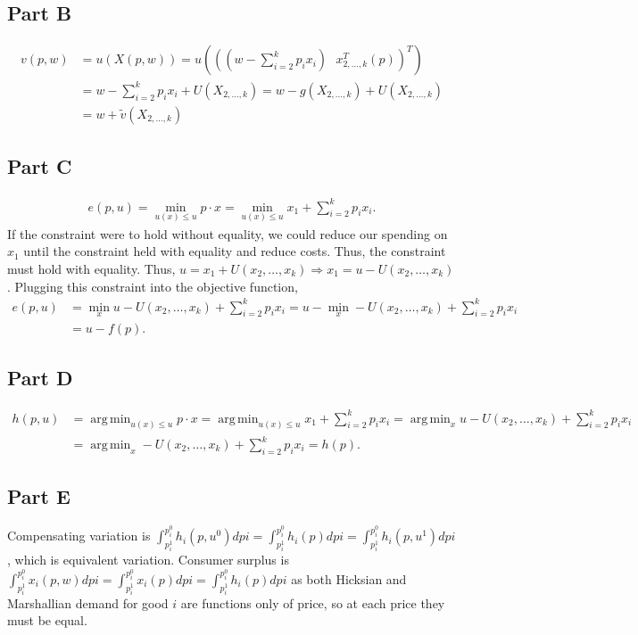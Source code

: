 \documentclass[11pt]{article} %
\DeclareMathOperator*{\argmin}{arg\,min}
\begin{document}
\subsection{Part B}
\begin{align*}
v(p,w) &= u(X(p,w)) = u\left(\left(\left(w - \sum_{i=2}^k p_i x_i\right) \text{ } x_{2,\dots,k}^{T}(p)\right)^{T}\right)\\
&= w - \sum_{i=2}^k p_i x_i+ U(X_{2,\dots,k}) = w - g(X_{2,\dots,k}) +U(X_{2,\dots,k}) \\&= w + \tilde{v}(X_{2,\dots,k})
\end{align*}
\subsection{Part C}
\begin{align*}
e(p,u) = \min_{u(x)\leq u} p \cdot x = \min_{u(x)\leq u} x_1 + \sum_{i=2}^k p_ix_i.
\end{align*}
If the constraint were to hold without equality, we could reduce our spending on $x_1$ until the constraint held with equality and reduce costs. Thus, the constraint must hold with equality. Thus, $u = x_1 +U(x_2,\dots,x_k) \Rightarrow x_1 = u - U(x_2,\dots,x_k)$. Plugging this constraint into the objective function,
\begin{align*}
e(p,u) &= \min_{x} u - U(x_2,\dots,x_k) + \sum_{i=2}^k p_ix_i = u - \min_{x} - U(x_2,\dots,x_k) + \sum_{i=2}^k p_ix_i \\&= u - f(p).
\end{align*}
\subsection{Part D}
\begin{align*}
h(p,u) &= \argmin_{u(x)\leq u} p \cdot x = \argmin_{u(x)\leq u} x_1 + \sum_{i=2}^k p_ix_i = \argmin_{x} u - U(x_2,\dots,x_k) +  \sum_{i=2}^k p_ix_i \\&=  \argmin_{x} - U(x_2,\dots,x_k) +  \sum_{i=2}^k p_ix_i = h(p).
\end{align*}
\subsection{Part E}
Compensating variation is $\int_{p_i^1}^{p_i^0}h_i(p,u^0)dpi = \int_{p_i^1}^{p_i^0}h_i(p)dpi = \int_{p_i^1}^{p_i^0}h_i(p,u^1)dpi$, which is equivalent variation. Consumer surplus is $\int_{p_i^1}^{p_i^0}x_i(p,w)dpi = \int_{p_i^1}^{p_i^0}x_i(p)dpi =  \int_{p_i^1}^{p_i^0}h_i(p)dpi $ as both Hicksian and Marshallian demand for good $i$ are functions only of price, so at each price they must be equal.%
\end{document}
